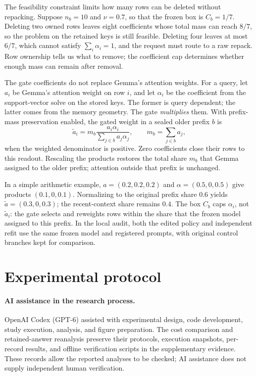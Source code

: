 The feasibility constraint limits how many rows can be deleted without repacking.
Suppose \(n_b=10\) and \(\nu=0.7\), so that the frozen box is \(C_b=1/7\).
Deleting two owned rows leaves eight coefficients whose total mass can reach
\(8/7\), so the problem on the retained keys is still feasible. Deleting four leaves at
most \(6/7\), which cannot satisfy \(\sum_i\alpha_i=1\), and the request must
route to a raw repack. Row ownership tells us what to remove; the coefficient
cap determines whether enough mass can remain after removal.

The gate coefficients do not replace Gemma's attention weights. For a query,
let $a_i$ be Gemma's attention weight on row $i$, and let $\alpha_i$ be the
coefficient from the support-vector solve on the stored keys. The former is
query dependent; the latter comes from the memory geometry. The gate
\emph{multiplies} them. With prefix-mass preservation enabled, the gated
weight in a sealed older prefix $b$ is
\begin{equation}
\widetilde a_i
= m_b\frac{a_i\alpha_i}{\sum_{j\in b}a_j\alpha_j},
\qquad m_b=\sum_{j\in b}a_j,
\label{eq:attention-gate}
\end{equation}
when the weighted denominator is positive. Zero coefficients close their rows
to this readout. Rescaling the products restores the total share $m_b$ that
Gemma assigned to the older prefix; attention outside that prefix is unchanged.

In a simple arithmetic example, $a=(0.2,0.2,0.2)$ and
$\alpha=(0.5,0,0.5)$ give products
$(0.1,0,0.1)$. Normalizing to the original prefix share $0.6$ yields
$\widetilde a=(0.3,0,0.3)$; the recent-context share remains $0.4$.
The box $C_b$ caps $\alpha_i$, not $\widetilde a_i$: the gate selects and
reweights rows within the share that the frozen model assigned to this
prefix. In the local audit, both the edited policy and independent refit use
the same frozen model and registered prompts, with original control branches
kept for comparison.


\section{Experimental protocol}\label{sec:protocol}

\paragraph{AI assistance in the research process.}
OpenAI Codex (GPT-6) assisted with experimental design, code development,
study execution, analysis, and figure preparation. The cost comparison and
retained-answer reanalysis preserve their protocols, execution snapshots,
per-record results, and offline verification scripts in the supplementary
evidence. These records allow the reported analyses to be checked; AI
assistance does not supply independent human verification.


